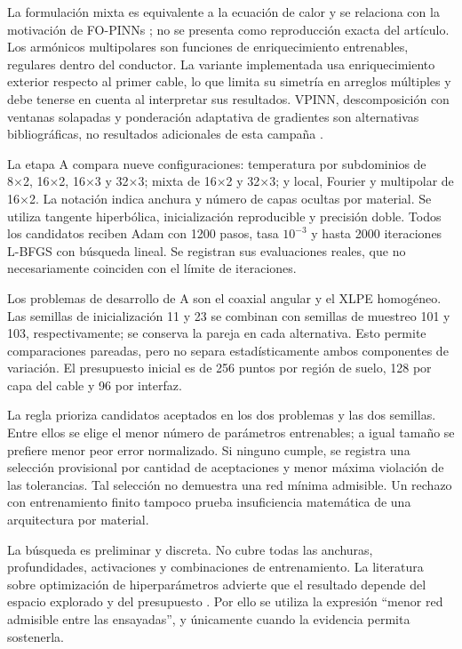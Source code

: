 La formulación mixta es equivalente a la ecuación de calor y se relaciona con la motivación de FO-PINNs \parencite{gladstone2022fopinn}; no se presenta como reproducción exacta del artículo. Los armónicos multipolares son funciones de enriquecimiento entrenables, regulares dentro del conductor. La variante implementada usa enriquecimiento exterior respecto al primer cable, lo que limita su simetría en arreglos múltiples y debe tenerse en cuenta al interpretar sus resultados. VPINN, descomposición con ventanas solapadas y ponderación adaptativa de gradientes son alternativas bibliográficas, no resultados adicionales de esta campaña \parencites{kharazmi2020hpvpinn}{moseley2021fbpinn}{wang2020gradients}.

La etapa A compara nueve configuraciones: temperatura por subdominios de 8×2, 16×2, 16×3 y 32×3; mixta de 16×2 y 32×3; y local, Fourier y multipolar de 16×2. La notación indica anchura y número de capas ocultas por material. Se utiliza tangente hiperbólica, inicialización reproducible y precisión doble. Todos los candidatos reciben Adam con 1200 pasos, tasa $10^{-3}$ y hasta 2000 iteraciones L-BFGS con búsqueda lineal. Se registran sus evaluaciones reales, que no necesariamente coinciden con el límite de iteraciones.

Los problemas de desarrollo de A son el coaxial angular y el XLPE homogéneo. Las semillas de inicialización 11 y 23 se combinan con semillas de muestreo 101 y 103, respectivamente; se conserva la pareja en cada alternativa. Esto permite comparaciones pareadas, pero no separa estadísticamente ambos componentes de variación. El presupuesto inicial es de 256 puntos por región de suelo, 128 por capa del cable y 96 por interfaz.

La regla prioriza candidatos aceptados en los dos problemas y las dos semillas. Entre ellos se elige el menor número de parámetros entrenables; a igual tamaño se prefiere menor peor error normalizado. Si ninguno cumple, se registra una selección provisional por cantidad de aceptaciones y menor máxima violación de las tolerancias. Tal selección no demuestra una red mínima admisible. Un rechazo con entrenamiento finito tampoco prueba insuficiencia matemática de una arquitectura por material.

La búsqueda es preliminar y discreta. No cubre todas las anchuras, profundidades, activaciones y combinaciones de entrenamiento. La literatura sobre optimización de hiperparámetros advierte que el resultado depende del espacio explorado y del presupuesto \parencite{bergstra2012random}. Por ello se utiliza la expresión ``menor red admisible entre las ensayadas'', y únicamente cuando la evidencia permita sostenerla.

